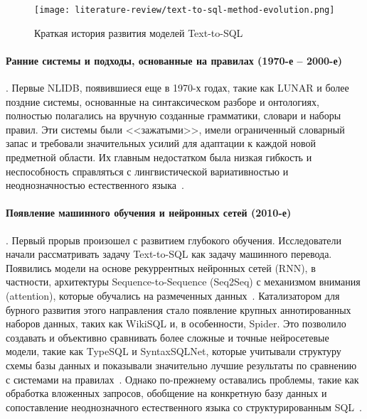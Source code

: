 \begin{figure}[!htb]
      \centering
      \texttt{[image: literature-review/text-to-sql-method-evolution.png]}
      \caption{Краткая история развития моделей Text-to-SQL}
      \label{fig:text-to-sql-method-evolution}
\end{figure}

\paragraph{Ранние системы и подходы, основанные на правилах (1970-е – 2000-е)}. Первые NLIDB,
появившиеся еще в 1970-х годах, такие как LUNAR и более поздние системы,
основанные на синтаксическом разборе и онтологиях, полностью полагались на вручную созданные грамматики,
словари и наборы правил. Эти системы были <<зажатыми>>, имели ограниченный словарный запас и
требовали значительных усилий для адаптации к каждой новой предметной области.
Их главным недостатком была низкая гибкость и неспособность справляться с лингвистической вариативностью и
неоднозначностью естественного языка~\cite{karimiNonEnglishNaturalLanguage2022,
      pazosr.ComparativeStudyCustomization2016, kimNaturalLanguageSQL2020,
      bradDatasetNeuralNatural2017, mohammadjafariNaturalLanguageSQL2025}.

\paragraph{Появление машинного обучения и нейронных сетей (2010-е)}. Первый прорыв произошел с
развитием глубокого обучения. Исследователи начали рассматривать задачу Text-to-SQL как задачу
машинного перевода. Появились модели на основе рекуррентных нейронных сетей (RNN), в частности,
архитектуры Sequence-to-Sequence (Seq2Seq) с механизмом внимания (attention),
которые обучались на размеченных данных~\cite{bradDatasetNeuralNatural2017, visperasModernTexttoSQLSemantic2023}.
Катализатором для бурного развития этого направления стало появление крупных аннотированных
наборов данных, таких как WikiSQL и, в особенности, Spider.
Это позволило создавать и объективно сравнивать более сложные и точные нейросетевые модели,
такие как TypeSQL и SyntaxSQLNet, которые учитывали структуру схемы базы данных и
показывали значительно лучшие результаты по сравнению с системами
на правилах~\cite{kimNaturalLanguageSQL2020, visperasModernTexttoSQLSemantic2023}.
Однако по-прежнему оставались проблемы, такие как обработка вложенных запросов,
обобщение на конкретную базу данных и сопоставление неоднозначного естественного языка со структурированным
SQL~\cite{mohammadjafariNaturalLanguageSQL2025}.

